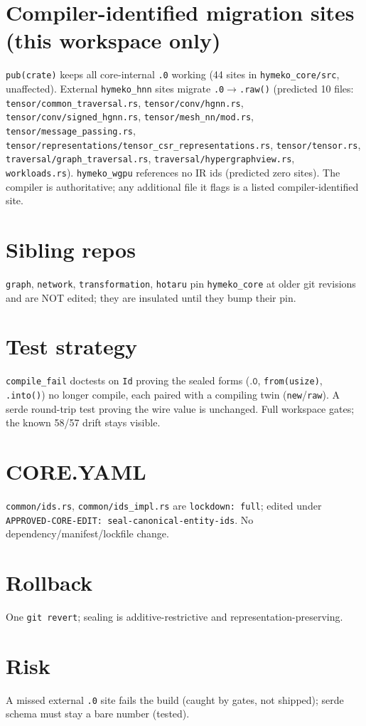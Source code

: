 \documentclass[11pt]{article}
\begin{document}
\section{Compiler-identified migration sites (this workspace only)}
\texttt{pub(crate)} keeps all core-internal \texttt{.0} working (44 sites in
\texttt{hymeko\_core/src}, unaffected). External \texttt{hymeko\_hnn} sites migrate
\texttt{.0}$\to$\texttt{.raw()} (predicted 10 files:
\texttt{tensor/common\_traversal.rs}, \texttt{tensor/conv/hgnn.rs},
\texttt{tensor/conv/signed\_hgnn.rs}, \texttt{tensor/mesh\_nn/mod.rs},
\texttt{tensor/message\_passing.rs},
\texttt{tensor/representations/tensor\_csr\_representations.rs},
\texttt{tensor/tensor.rs}, \texttt{traversal/graph\_traversal.rs},
\texttt{traversal/hypergraphview.rs}, \texttt{workloads.rs}).
\texttt{hymeko\_wgpu} references no IR ids (predicted zero sites). The compiler is
authoritative; any additional file it flags is a listed compiler-identified site.
\section{Sibling repos} \texttt{graph}, \texttt{network}, \texttt{transformation},
\texttt{hotaru} pin \texttt{hymeko\_core} at older git revisions and are NOT edited;
they are insulated until they bump their pin.
\section{Test strategy} \texttt{compile\_fail} doctests on \texttt{Id} proving the
sealed forms ($\texttt{.0}$, \texttt{from(usize)}, \texttt{.into()}) no longer
compile, each paired with a compiling twin (\texttt{new}/\texttt{raw}). A serde
round-trip test proving the wire value is unchanged. Full workspace gates; the
known 58/57 drift stays visible.
\section{CORE.YAML} \texttt{common/ids.rs}, \texttt{common/ids\_impl.rs} are
\texttt{lockdown: full}; edited under \texttt{APPROVED-CORE-EDIT:
seal-canonical-entity-ids}. No dependency/manifest/lockfile change.
\section{Rollback} One \texttt{git revert}; sealing is additive-restrictive and
representation-preserving. \section{Risk} A missed external \texttt{.0} site fails
the build (caught by gates, not shipped); serde schema must stay a bare number
(tested).
\end{document}
